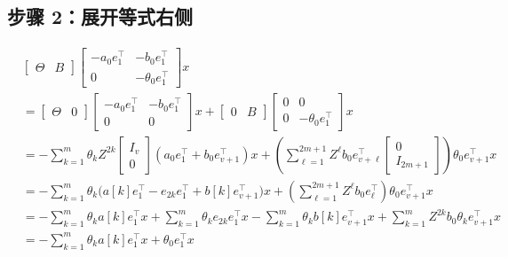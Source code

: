 \documentclass[12pt,a4paper]{article}
\begin{document}
\subsection{步骤 2：展开等式右侧}

\begin{align*}
&\left[\begin{array}{c|c} \Theta & B \end{array}\right]
\left[
\begin{array}{c|c}
-a_0e_1^\top & -b_0e_1^\top \\ \hline
0 & -\theta_0e_1^\top
\end{array}
\right] x \\
&= \left[\begin{array}{c|c} \Theta & 0 \end{array}\right]
\left[\begin{array}{c|c} -a_0e_1^\top & -b_0e_1^\top \\ \hline 0 & 0 \end{array}\right] x
+ \left[\begin{array}{c|c} 0 & B \end{array}\right]
\left[\begin{array}{c|c} 0 & 0 \\ \hline 0 & -\theta_0e_1^\top \end{array}\right] x \\
&= -\sum_{k=1}^{m} \theta_k Z^{2k}
\begin{bmatrix} I_v \\ 0 \end{bmatrix}
(a_0e_1^\top + b_0 e_{v+1}^\top)x
+ \left(\sum_{\ell=1}^{2m+1} Z^{\ell} b_0 e_{v+\ell}^\top
\begin{bmatrix} 0 \\ I_{2m+1} \end{bmatrix}\right)
\theta_0 e_{v+1}^\top x \\
&= -\sum_{k=1}^{m} \theta_k
\bigl(a[k]e_1^\top - e_{2k}e_1^\top + b[k]e_{v+1}^\top\bigr)x
+ \left(\sum_{\ell=1}^{2m+1} Z^{\ell} b_0 e_{\ell}^\top \right)
\theta_0 e_{v+1}^\top x \\
&= -\sum_{k=1}^{m} \theta_k a[k]e_1^\top x
+ \sum_{k=1}^{m} \theta_k e_{2k}e_1^\top x
- \sum_{k=1}^{m} \theta_k b[k]e_{v+1}^\top x
+ \sum_{k=1}^{m} Z^{2k} b_0 \theta_k e_{v+1}^\top x \\
&= -\sum_{k=1}^{m} \theta_k a[k]e_1^\top x + \theta_0 e_1^\top x
\end{align*}
\end{document}
